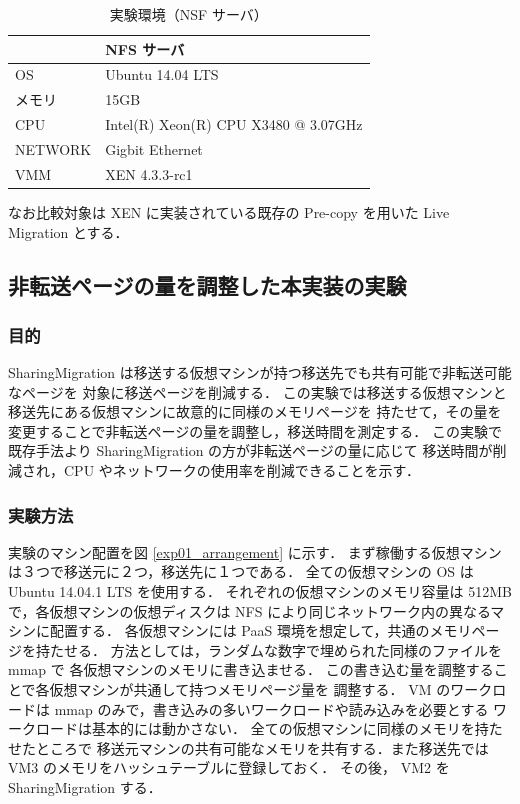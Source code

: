 \documentclass[graduation-thesis]{mlarticle}
\begin{document}
\begin{table}[htb]
\caption{\label{machine_env_nfs}実験環境（NSF サーバ）}
\centering
\begin{tabular}{|l|l|}
\hline
 & NFS サーバ\\
\hline
OS & Ubuntu 14.04 LTS\\
\hline
メモリ & 15GB\\
\hline
CPU & Intel(R) Xeon(R) CPU X3480  @ 3.07GHz\\
\hline
NETWORK & Gigbit Ethernet\\
\hline
VMM & XEN 4.3.3-rc1\\
\hline
\end{tabular}
\end{table}

なお比較対象は XEN に実装されている既存の Pre-copy を用いた
Live Migration とする．
\subsection{非転送ページの量を調整した本実装の実験}
\label{sec-6-1}
\subsubsection{目的}
\label{sec-6-1-1}
SharingMigration は移送する仮想マシンが持つ移送先でも共有可能で非転送可能なページを
対象に移送ページを削減する．
この実験では移送する仮想マシンと移送先にある仮想マシンに故意的に同様のメモリページを
持たせて，その量を変更することで非転送ページの量を調整し，移送時間を測定する．
この実験で既存手法より SharingMigration の方が非転送ページの量に応じて
移送時間が削減され，CPU やネットワークの使用率を削減できることを示す．

\subsubsection{実験方法}
\label{sec-6-1-2}
実験のマシン配置を図 \ref{exp01_arrangement} に示す．
まず稼働する仮想マシンは３つで移送元に２つ，移送先に１つである．
全ての仮想マシンの OS は Ubuntu 14.04.1 LTS を使用する．
それぞれの仮想マシンのメモリ容量は 512MB で，各仮想マシンの仮想ディスクは
NFS により同じネットワーク内の異なるマシンに配置する．
各仮想マシンには PaaS 環境を想定して，共通のメモリページを持たせる．
方法としては，ランダムな数字で埋められた同様のファイルを mmap で
各仮想マシンのメモリに書き込ませる．
この書き込む量を調整することで各仮想マシンが共通して持つメモリページ量を
調整する．
VM のワークロードは mmap のみで，書き込みの多いワークロードや読み込みを必要とする
ワークロードは基本的には動かさない．
全ての仮想マシンに同様のメモリを持たせたところで
移送元マシンの共有可能なメモリを共有する．また移送先では
VM3 のメモリをハッシュテーブルに登録しておく．
その後， VM2 を SharingMigration する．
\end{document}
